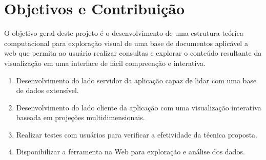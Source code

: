 \section{Objetivos e Contribuição}
\label{Objetivos}

O objetivo geral deste projeto é o desenvolvimento de uma estrutura teórica computacional para exploração visual de uma base de documentos aplicável a web que permita ao usuário realizar consultas e explorar o conteúdo resultante da visualização em uma interface de fácil compreenção e interativa.


\begin{enumerate} %
	\item Desenvolvimento do lado servidor da aplicação capaz de lidar com uma base de dados extensível.
    \item Desenvolvimento do lado cliente da aplicação com uma visualização interativa baseada em projeções multidimensionais.
       \item Realizar testes com usuários para verificar a efetividade da técnica proposta.
	\item Disponibilizar a ferramenta na Web para exploração e análise dos dados.
		
	
\end{enumerate} %